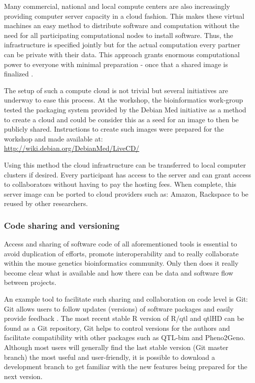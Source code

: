 Many commercial, national and local compute centers are also increasingly providing computer
server capacity in a cloud fashion. This makes these virtual machines an easy method to distribute 
software and computation without the need for all participating computational nodes to install 
software. Thus, the infrastructure is specified jointly \cite{Foster:2008} but for the actual computation every 
partner can be private with their data. This approach grants enormous computational power to 
everyone with minimal preparation - once that a shared image is finalized \cite{Krampis:2012}.

The setup of such a compute cloud is not trivial but several initiatives are underway to ease 
this process. At the workshop, the bioinformatics work-group tested the packaging system provided by 
the Debian Med initiative as a method to create a cloud and could be consider this as a seed 
for an image to then be publicly shared. Instructions to create such images were prepared for 
the workshop and made available at:\\
\url{http://wiki.debian.org/DebianMed/LiveCD/}
 
Using this method the cloud infrastructure can be transferred to local computer clusters 
if desired. Every participant has access to the server and can grant access to collaborators 
without having to pay the hosting fees. When complete, this server image can be ported to 
cloud providers such as: Amazon, Rackspace to be reused by other researchers.

\subsubsection*{Code sharing and versioning}
Access and sharing of software code of all aforementioned tools is essential to avoid 
duplication of efforts, promote interoperability and to really collaborate within the mouse 
genetics bioinformatics community. Only then does it really become clear what is available 
and how there can be data and software flow between projects.

An example tool to facilitate such sharing and collaboration on code level is Git: Git 
allows users to follow updates (versions) of software packages and easily provide feedback \cite{Git:2007}. 
The most recent stable R version of R/qtl and qtlHD can be found as a Git repository, Git 
helps to control versions for the authors and facilitate compatibility with other packages 
such as QTL-bim and Pheno2Geno. Although most users will generally find the last stable version 
(Git master branch) the most useful and user-friendly, it is possible to download a 
development branch to get familiar with the new features being prepared for the next version.


